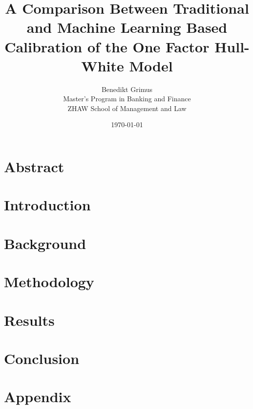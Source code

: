 \documentclass[12pt,a4paper]{article}
\title{A Comparison Between Traditional and Machine Learning Based Calibration of the One Factor Hull-White Model}
\author{Benedikt Grimus \\
\small Master’s Program in Banking and Finance \\
\small ZHAW School of Management and Law}
\date{\today}
\begin{document}
\maketitle
\clearpage

\clearpage
\section*{Abstract}

\clearpage

\tableofcontents
\clearpage

\section{Introduction}
\label{introduction}


\section{Background}
\label{background}


\section{Methodology}
\label{methodology}


\section{Results}
\label{results}


\section{Conclusion}
\label{conclusion}


\printbibliography
\appendix
\section{Appendix}

\end{document}

